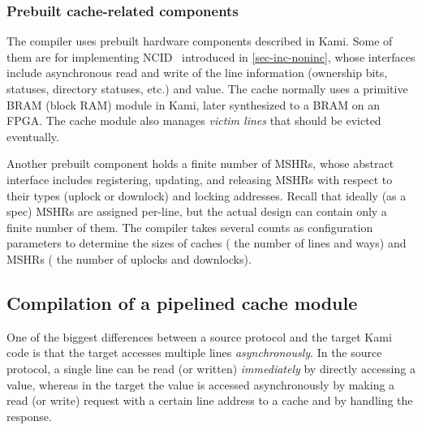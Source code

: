 \subsubsection{Prebuilt cache-related components}

The compiler uses prebuilt hardware components described in Kami.
Some of them are for implementing NCID~\cite{Zhao:2010} introduced in \autoref{sec-inc-noninc}, whose interfaces include asynchronous read and write of the line information (ownership bits, statuses, directory statuses, etc.) and value.
The cache normally uses a primitive BRAM (block RAM) module in Kami, later synthesized to a BRAM on an FPGA.
The cache module also manages \emph{victim lines} that should be evicted eventually.

Another prebuilt component holds a finite number of MSHRs, whose abstract interface includes registering, updating, and releasing MSHRs with respect to their types (uplock or downlock) and locking addresses.
Recall that ideally (as a spec) MSHRs are assigned per-line, but the actual design can contain only a finite number of them.
The compiler takes several counts as configuration parameters to determine the sizes of caches (\eg{} the number of lines and ways) and MSHRs (\eg{} the number of uplocks and downlocks).

\subsection{Compilation of a pipelined cache module}

One of the biggest differences between a source \hemiola{} protocol and the target Kami code is that the target accesses multiple lines \emph{asynchronously}.
In the source protocol, a single line can be read (or written) \emph{immediately} by directly accessing a value, whereas in the target the value is accessed asynchronously by making a read (or write) request with a certain line address to a cache and by handling the response.

